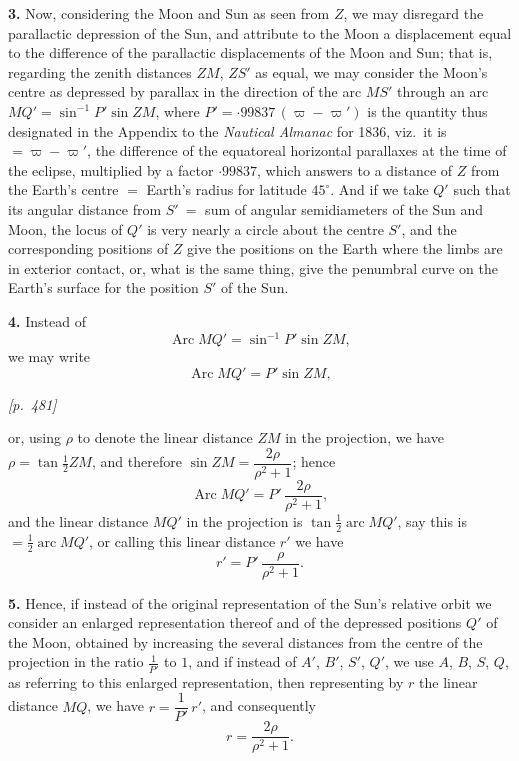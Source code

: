 \documentclass[11pt]{article}
\begin{document}
\medskip

\textbf{3.} Now, considering the Moon and Sun as seen from $Z$, we may
disregard the parallactic depression of the Sun, and attribute to the Moon
a displacement equal to the difference of the parallactic displacements of
the Moon and Sun; that is, regarding the zenith distances $ZM$, $ZS'$ as
equal, we may consider the Moon's centre as depressed by parallax in the
direction of the arc $MS'$ through an arc $MQ' = \sin^{-1}P'\sin ZM$,
where $P'={\cdot}99837\,(\varpi-\varpi')$ is the quantity thus designated
in the Appendix to the \textit{Nautical Almanac} for 1836, viz.\ it is
$=\varpi-\varpi'$, the difference of the equatoreal horizontal parallaxes
at the time of the eclipse, multiplied by a factor ${\cdot}99837$, which
answers to a distance of $Z$ from the Earth's centre $=$ Earth's radius
for latitude $45^{\circ}$. And if we take $Q'$ such that its angular
distance from $S'\ =$ sum of angular semidiameters of the Sun and Moon,
the locus of $Q'$ is very nearly a circle about the centre $S'$, and the
corresponding positions of $Z$ give the positions on the Earth where the
limbs are in exterior contact, or, what is the same thing, give the
penumbral curve on the Earth's surface for the position $S'$ of the Sun.

\medskip

\textbf{4.} Instead of
\[
\operatorname{Arc} MQ' = \sin^{-1}P'\sin ZM,
\]
we may write
\[
\operatorname{Arc} MQ' = P'\sin ZM,
\]

\medskip

\noindent\textit{[p.~481]}

\medskip

or, using $\rho$ to denote the linear distance $ZM$ in the projection, we
have $\rho = \tan\tfrac{1}{2}ZM$, and therefore $\sin ZM = \dfrac{2\rho}{\rho^{2}+1}$;
hence
\[
\operatorname{Arc} MQ' = P'\,\frac{2\rho}{\rho^{2}+1},
\]
and the linear distance $MQ'$ in the projection is $\tan\tfrac{1}{2}\operatorname{arc}MQ'$,
say this is $=\tfrac{1}{2}\operatorname{arc}MQ'$, or calling this linear
distance $r'$ we have
\[
r' = P'\,\frac{\rho}{\rho^{2}+1}.
\]

\textbf{5.} Hence, if instead of the original representation of the Sun's
relative orbit we consider an enlarged representation thereof and of the
depressed positions $Q'$ of the Moon, obtained by increasing the several
distances from the centre of the projection in the ratio $\tfrac{1}{P'}$
to $1$, and if instead of $A'$, $B'$, $S'$, $Q'$, we use $A$, $B$, $S$,
$Q$, as referring to this enlarged representation, then representing by
$r$ the linear distance $MQ$, we have
$r = \dfrac{1}{P'}\,r'$, and consequently
\[
r = \frac{2\rho}{\rho^{2}+1}.
\]
\end{document}
